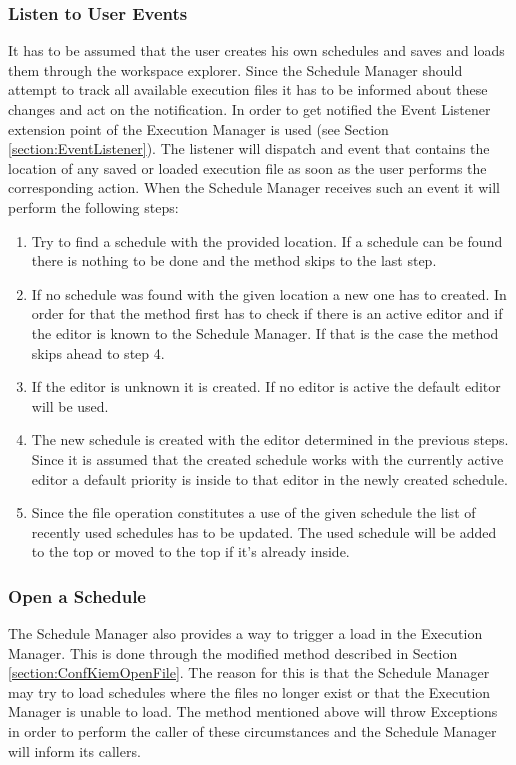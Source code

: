\subsubsection{Listen to User Events}
\label{section:UserEvents}
It has to be assumed that the user creates his own schedules and saves and loads them through the workspace explorer.
Since the Schedule Manager should attempt to track all available execution files it has to be informed about
these changes and act on the notification. In order to get notified the Event Listener extension point
of the Execution Manager is used (see Section \ref{section:EventListener}). The listener will dispatch and event
that contains the location of any saved or loaded execution file as soon as the user performs the corresponding action.
When the Schedule Manager receives such an event it will perform the following steps:
\begin{enumerate}
 \item Try to find a schedule with the provided location. If a schedule can be found there is nothing to be
done and the method skips to the last step.
 \item If no schedule was found with the given location a new one has to created. In order for that the method
first has to check if there is an active editor and if the editor is known to the Schedule Manager. If that is
the case the method skips ahead to step 4.
 \item If the editor is unknown it is created. If no editor is active the default editor will be used.
 \item The new schedule is created with the editor determined in the previous steps. Since it is assumed that
the created schedule works with the currently active editor a default priority is inside to that editor in the
newly created schedule.
 \item Since the file operation constitutes a use of the given schedule the list of recently used schedules has
to be updated. The used schedule will be added to the top or moved to the top if it's already inside.
\end{enumerate}


\subsubsection{Open a Schedule}
\label{section:OpenSchedule}
The Schedule Manager also provides a way to trigger a load in the Execution Manager. This is
done through the modified method described in Section \ref{section:ConfKiemOpenFile}. The reason for this
is that the Schedule Manager may try to load schedules where the files no longer exist or that the 
Execution Manager is unable to load. The method mentioned above will throw Exceptions in order to perform
the caller of these circumstances and the Schedule Manager will inform its callers.

